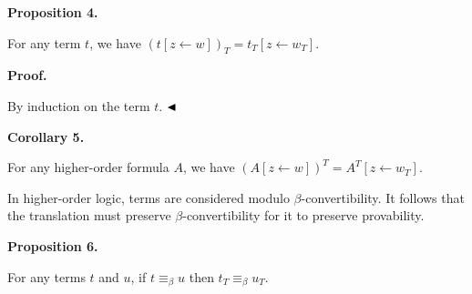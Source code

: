 \documentclass[10pt,a4paper]{article}
\begin{document}
 
 
\par\medskip\noindent\textbf{Proposition 4.}\par
 
 
For any term $t$, we have $(t[z\leftarrow w])_{T}=t_{T}[z\leftarrow w_{T}]$.\par
 
 
 
 
\par\medskip\noindent\textbf{Proof.}\par
 
 
By induction on the term $t$. $\hfill\blacktriangleleft$\par
 
 
 
\par\medskip\noindent\textbf{Corollary 5.}\par
 
 
For any higher-order formula $A$, we have $(A[z\leftarrow w])^{T}=A^{T}[z\leftarrow w_{T}]$.\par
 
 
 
 
In higher-order logic, terms are considered modulo $\beta$-convertibility. It follows that the translation must preserve $\beta$-convertibility for it to preserve provability.\par
 
 
 
\par\medskip\noindent\textbf{Proposition 6.}\par
 
 
For any terms $t$ and $u$, if $t\equiv_{\beta}u$ then $t_{T}\equiv_{\beta}u_{T}$.\par
 
\end{document}
